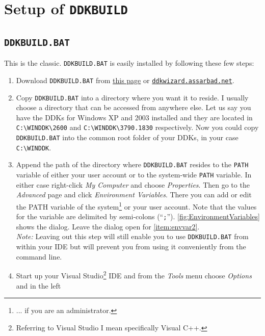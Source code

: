 \documentclass[a4paper,titlepage]{report}
\newcommand{\linkclr}[1]{\textcolor[rgb]{0.00,0.00,0.60}{#1}}
\newcommand{\extlink}[2]{\href{#1}{\linkclr{#2}}}
\newcommand{\extlinktt}[2]{\href{#1}{\texttt{\linkclr{#2}}}}
\begin{document}
\chapter{Setup of \texttt{DDKBUILD}}\thispagestyle{fancy}
\section{\texttt{DDKBUILD.BAT}}
\label{sec:batchversion}
This is the classic. \texttt{DDKBUILD.BAT} is easily installed by following these
few steps:
\begin{enumerate}
  \item
    Download \texttt{DDKBUILD.BAT} from \extlink{http://www.osronline.com/article.cfm?article=43}{this page}
    or \extlinktt{http://ddkwizard.assarbad.net}{ddkwizard.assarbad.net}.
  \item
    Copy \texttt{DDKBUILD.BAT} into a directory where you want it to reside. I usually
    choose a directory that can be accessed from anywhere else. Let us say you have
    the DDKs for Windows XP and 2003 installed and they are located in \verb+C:\WINDDK\2600+
    and \verb+C:\WINDDK\3790.1830+ respectively. Now you could copy \texttt{DDKBUILD.BAT}
    into the common root folder of your DDKs, in your case \verb+C:\WINDDK+.
  \item \label{item:envvar1}
    Append the path of the directory where \texttt{DDKBUILD.BAT} resides to the \texttt{PATH}
    variable of either your user account or to the system-wide \texttt{PATH} variable. In
    either case right-click \emph{My Computer} and choose \emph{Properties}. Then go to the
    \emph{Advanced} page and click \emph{Environment Variables}. There you can add or edit
    the PATH variable of the system\footnote{... if you are an administrator.} or your user
    account. Note that the values for the variable are delimited by semi-colons (``\texttt{;}'').
    \autoref{fig:EnvironmentVariables} shows the dialog. Leave the dialog open for
    \autoref{item:envvar2}.\\
    \emph{Note:} Leaving out this step will still enable you to use \texttt{DDKBUILD.BAT} from
    within your IDE but will prevent you from using it conveniently from the command line.
  \item
    Start up your Visual Studio\footnote{Referring to Visual Studio I mean specifically
    Visual C++.} IDE and from the \emph{Tools} menu choose \emph{Options} and in the left

\end{enumerate}
\end{document}
